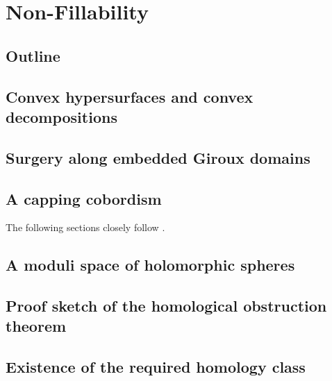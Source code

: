 \documentclass[oneside]{amsbook}
\begin{document}
\chapter{Non-Fillability}\label{chap:nonfillable}
\section{Outline}

\section{Convex hypersurfaces and convex decompositions}\label{sec:convex_decomposition}

\section{Surgery along embedded Giroux domains}

\section{A capping cobordism}
The following sections closely follow \cite[Section 6]{BGM22}.

\section{A moduli space of holomorphic spheres}

\section{Proof sketch of the homological obstruction theorem}\label{sec:proof_hom_obstr}

\section{Existence of the required homology class}\label{sec:homology_class}



\end{document}
